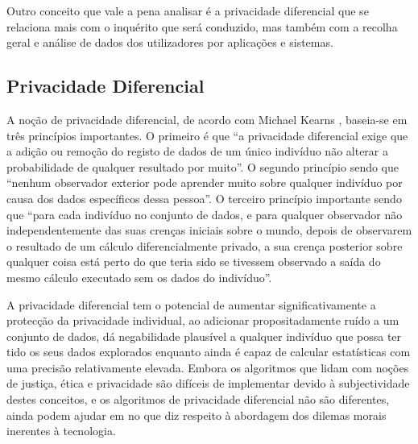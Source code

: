 \documentclass[conference]{IEEEtran}
\begin{document}
Outro conceito que vale a pena analisar é a privacidade diferencial que
se relaciona mais com o inquérito que será conduzido, mas também com a recolha
geral e análise de dados dos utilizadores por aplicações e sistemas.


\subsection{Privacidade Diferencial}

A noção de privacidade diferencial, de acordo com Michael Kearns \cite{kearns2019ethical},
baseia-se em três princípios importantes. O primeiro é que ``a privacidade
diferencial exige que a adição ou remoção do registo de dados de um único
indivíduo não alterar a probabilidade de qualquer resultado por muito''.
O segundo princípio sendo que ``nenhum observador exterior pode aprender
muito sobre qualquer indivíduo por causa dos dados específicos dessa pessoa''.
O terceiro princípio importante sendo que ``para cada indivíduo no conjunto
de dados, e para qualquer observador não independentemente das suas crenças
iniciais sobre o mundo, depois de observarem o resultado de um cálculo diferencialmente
privado, a sua crença posterior sobre qualquer coisa está perto do que teria
sido se tivessem observado a saída do mesmo cálculo executado sem os dados
do indivíduo''.


A privacidade diferencial tem o potencial de aumentar significativamente a
protecção da privacidade individual, ao adicionar propositadamente ruído a
um conjunto de dados, dá negabilidade plausível a qualquer indivíduo que possa
ter tido os seus dados explorados enquanto ainda é capaz de calcular estatísticas
com uma precisão relativamente elevada. Embora os algoritmos que lidam com
noções de justiça, ética e privacidade são difíceis de implementar devido à
subjectividade destes conceitos, e os algoritmos de privacidade diferencial
não são diferentes, ainda podem ajudar em no que diz respeito à abordagem
dos dilemas morais inerentes à tecnologia.
\end{document}
